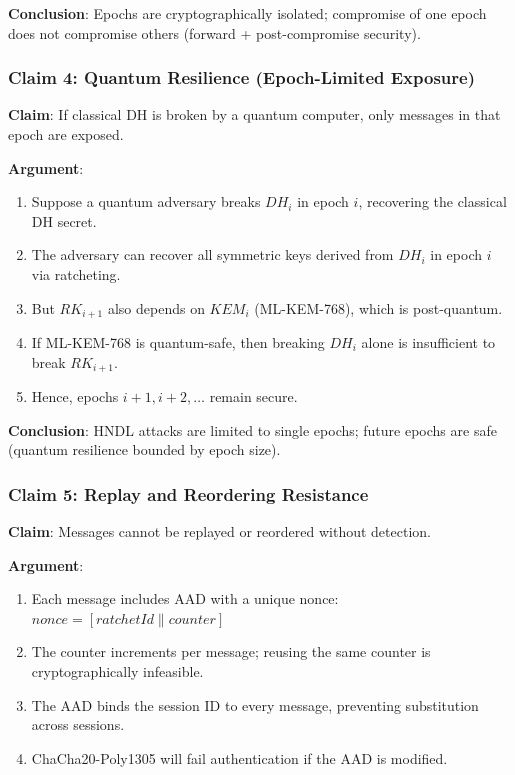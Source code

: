 \documentclass[11pt,a4paper,oneside]{article}
\begin{document}
\textbf{Conclusion}: Epochs are cryptographically isolated; compromise of one epoch does not compromise others (forward + post-compromise security).

\subsubsection{Claim 4: Quantum Resilience (Epoch-Limited Exposure)}

\textbf{Claim}: If classical DH is broken by a quantum computer, only messages in that epoch are exposed.

\textbf{Argument}:
\begin{enumerate}
\item Suppose a quantum adversary breaks $DH_i$ in epoch $i$, recovering the classical DH secret.
\item The adversary can recover all symmetric keys derived from $DH_i$ in epoch $i$ via ratcheting.
\item But $RK_{i+1}$ also depends on $KEM_i$ (ML-KEM-768), which is post-quantum.
\item If ML-KEM-768 is quantum-safe, then breaking $DH_i$ alone is insufficient to break $RK_{i+1}$.
\item Hence, epochs $i+1, i+2, \ldots$ remain secure.
\end{enumerate}

\textbf{Conclusion}: HNDL attacks are limited to single epochs; future epochs are safe (quantum resilience bounded by epoch size).

\subsubsection{Claim 5: Replay and Reordering Resistance}

\textbf{Claim}: Messages cannot be replayed or reordered without detection.

\textbf{Argument}:
\begin{enumerate}
\item Each message includes AAD with a unique nonce: $nonce = [ratchetId \| counter]$
\item The counter increments per message; reusing the same counter is cryptographically infeasible.
\item The AAD binds the session ID to every message, preventing substitution across sessions.
\item ChaCha20-Poly1305 will fail authentication if the AAD is modified.
\end{enumerate}
\end{document}

